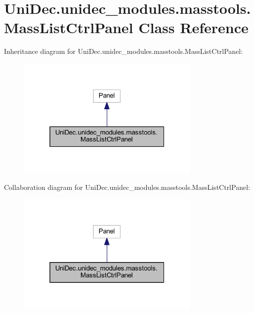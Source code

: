 \hypertarget{class_uni_dec_1_1unidec__modules_1_1masstools_1_1_mass_list_ctrl_panel}{}\section{Uni\+Dec.\+unidec\+\_\+modules.\+masstools.\+Mass\+List\+Ctrl\+Panel Class Reference}
\label{class_uni_dec_1_1unidec__modules_1_1masstools_1_1_mass_list_ctrl_panel}


Inheritance diagram for Uni\+Dec.\+unidec\+\_\+modules.\+masstools.\+Mass\+List\+Ctrl\+Panel\+:\nopagebreak
\begin{figure}[H]
\begin{center}
\leavevmode
\includegraphics[width=253pt]{class_uni_dec_1_1unidec__modules_1_1masstools_1_1_mass_list_ctrl_panel__inherit__graph}
\end{center}
\end{figure}


Collaboration diagram for Uni\+Dec.\+unidec\+\_\+modules.\+masstools.\+Mass\+List\+Ctrl\+Panel\+:\nopagebreak
\begin{figure}[H]
\begin{center}
\leavevmode
\includegraphics[width=253pt]{class_uni_dec_1_1unidec__modules_1_1masstools_1_1_mass_list_ctrl_panel__coll__graph}
\end{center}
\end{figure}
